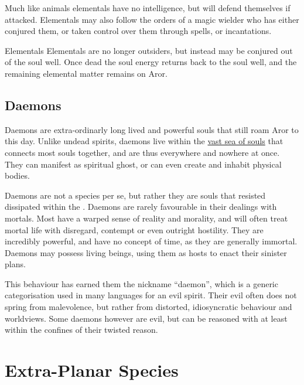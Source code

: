 Much like animals elementals have no intelligence, but will defend themselves
if attacked. Elementals may also follow the orders of a magic wielder who
has either conjured them, or taken control over them through spells, or
incantations.

\begin{35e}{Elementals}
  Elementals are no longer outsiders, but instead may be conjured out of the
  soul well. Once dead the soul energy returns back to the soul well, and the
  remaining elemental matter remains on Aror.
\end{35e}

\subsection{Daemons}
\label{sec:Daemons}

Daemons are extra-ordinarly long lived and powerful souls that still roam Aror
to this day. Unlike undead spirits, daemons live within the \hyperref[sec:Soul
  Well]{vast sea of souls} that connects most souls together, and are thus
everywhere and nowhere at once. They can manifest as spiritual ghost, or can
even create and inhabit physical bodies.

Daemons are not a species per se, but rather they are souls that resisted
dissipated within the . Daemons are rarely favourable
in their dealings with mortals. Most have a warped sense of reality and
morality, and will often treat mortal life with disregard, contempt or even
outright hostility. They are incredibly powerful, and have no concept of time,
as they are generally immortal. Daemons may possess living beings, using them
as hosts to enact their sinister plans.

This behaviour has earned them the nickname ``daemon'', which is a generic
categorisation used in many languages for an evil spirit. Their evil often
does not spring from malevolence, but rather from distorted, idiosyncratic
behaviour and worldviews. Some daemons however are evil, but can be reasoned
with at least within the confines of their twisted reason.







\section{Extra-Planar Species}
\label{sec:ExtraPlanar Species}

